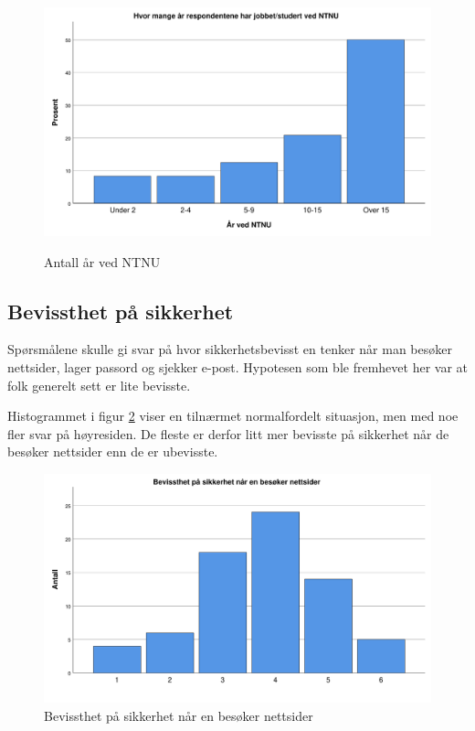 \begin{figure}[H]
    \centering
    \includegraphics[scale=0.5]{case_2/bilder/spss/aarvedNTNU.pdf}
    \label{fig:case2-aarvedNTNU}
    \caption[Antall år ved NTNU]{Antall år ved NTNU}
\end{figure}

\subsection{Bevissthet på sikkerhet}
Spørsmålene skulle gi svar på hvor sikkerhetsbevisst en tenker når man besøker nettsider, lager passord og sjekker e-post. Hypotesen som ble fremhevet her var at folk generelt sett er lite bevisste. 

Histogrammet i figur \ref{fig:case2-bevisst-nettsider} viser en tilnærmet normalfordelt situasjon, men med noe fler svar på høyresiden. De fleste er derfor litt mer bevisste på sikkerhet når de besøker nettsider enn de er ubevisste. 
\begin{figure}[H]
    \centering
    \includegraphics[scale=0.5]{case_2/bilder/spss/bevisst_nettsider.pdf}
    \caption[Bevisst på sikkerhet med nettsider]{Bevissthet på sikkerhet når en besøker nettsider}
    \label{fig:case2-bevisst-nettsider}
\end{figure}

